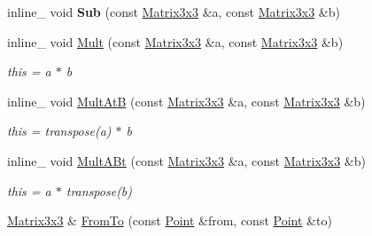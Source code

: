 \begin{DoxyCompactItemize}
\item 
inline\+\_\+ void {\bfseries Sub} (const \hyperlink{classOpcode_1_1Matrix3x3}{Matrix3x3} \&a, const \hyperlink{classOpcode_1_1Matrix3x3}{Matrix3x3} \&b)\hypertarget{classOpcode_1_1Matrix3x3_a5738eb21a2ee8185aeb60a3f20f5dd65}{}\label{classOpcode_1_1Matrix3x3_a5738eb21a2ee8185aeb60a3f20f5dd65}

\item 
inline\+\_\+ void \hyperlink{classOpcode_1_1Matrix3x3_a87e36cf90b98870fd4baf13ffd74bf8c}{Mult} (const \hyperlink{classOpcode_1_1Matrix3x3}{Matrix3x3} \&a, const \hyperlink{classOpcode_1_1Matrix3x3}{Matrix3x3} \&b)\hypertarget{classOpcode_1_1Matrix3x3_a87e36cf90b98870fd4baf13ffd74bf8c}{}\label{classOpcode_1_1Matrix3x3_a87e36cf90b98870fd4baf13ffd74bf8c}

\begin{DoxyCompactList}\small\item\em this = a $\ast$ b \end{DoxyCompactList}\item 
inline\+\_\+ void \hyperlink{classOpcode_1_1Matrix3x3_a2269b5502c67bdd42bccaba7428658f7}{Mult\+AtB} (const \hyperlink{classOpcode_1_1Matrix3x3}{Matrix3x3} \&a, const \hyperlink{classOpcode_1_1Matrix3x3}{Matrix3x3} \&b)\hypertarget{classOpcode_1_1Matrix3x3_a2269b5502c67bdd42bccaba7428658f7}{}\label{classOpcode_1_1Matrix3x3_a2269b5502c67bdd42bccaba7428658f7}

\begin{DoxyCompactList}\small\item\em this = transpose(a) $\ast$ b \end{DoxyCompactList}\item 
inline\+\_\+ void \hyperlink{classOpcode_1_1Matrix3x3_a89cfcdb9c2fb22b873a538663e8e56e8}{Mult\+A\+Bt} (const \hyperlink{classOpcode_1_1Matrix3x3}{Matrix3x3} \&a, const \hyperlink{classOpcode_1_1Matrix3x3}{Matrix3x3} \&b)\hypertarget{classOpcode_1_1Matrix3x3_a89cfcdb9c2fb22b873a538663e8e56e8}{}\label{classOpcode_1_1Matrix3x3_a89cfcdb9c2fb22b873a538663e8e56e8}

\begin{DoxyCompactList}\small\item\em this = a $\ast$ transpose(b) \end{DoxyCompactList}\item 
\hyperlink{classOpcode_1_1Matrix3x3}{Matrix3x3} \& \hyperlink{classOpcode_1_1Matrix3x3_aae3ad19c280b8cfe557c879a6369a93f}{From\+To} (const \hyperlink{classOpcode_1_1Point}{Point} \&from, const \hyperlink{classOpcode_1_1Point}{Point} \&to)\hypertarget{classOpcode_1_1Matrix3x3_aae3ad19c280b8cfe557c879a6369a93f}{}\label{classOpcode_1_1Matrix3x3_aae3ad19c280b8cfe557c879a6369a93f}


\end{DoxyCompactItemize}
